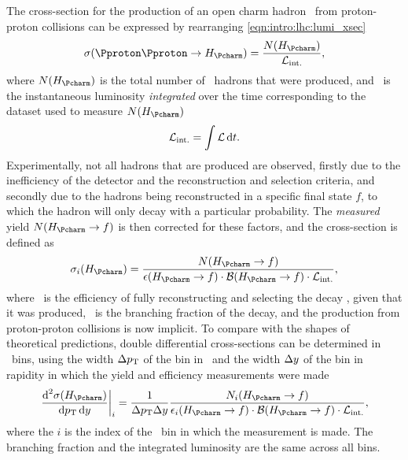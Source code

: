 The cross-section for the production of an open charm hadron \PHc\ from 
proton-proton collisions can be expressed by rearranging 
\cref{eqn:intro:lhc:lumi_xsec}
\begin{equation}
  \xsec(\ppToHc) = \frac{N(\PHc)}{\intlumi},
  \label{eqn:prod:introduction:simple_cross_section}
\end{equation}
where $N(\PHc)$ is the total number of \PHc\ hadrons that were produced, and 
\intlumi\ is the instantaneous luminosity \emph{integrated} over the time 
corresponding to the dataset used to measure $N(\PHc)$
\begin{equation}
  \mathcal{L}_{\textnormal{int.}} = \int \mathcal{L} \mathop{}\!\textnormal{d}{t}.
  \label{eqn:prod:introduction:integrated_lumi}
\end{equation}
Experimentally, not all hadrons that are produced are observed, firstly due to 
the inefficiency of the detector and the reconstruction and selection criteria, 
and secondly due to the hadrons being reconstructed in a specific final state 
$f$, to which the hadron will only decay with a particular probability.
The \emph{measured} yield $N(\HcTof)$ is then corrected for these factors, and the 
cross-section is defined as
\begin{equation}
  \xsec_{i}(\PHc) = \frac{%
    N(\HcTof)
  }{%
    \eff(\HcTof)\cdot\bfrac(\HcTof)\cdot\intlumi
  },
  \label{eqn:prod:introduction:cross_section}
\end{equation}
where \eff\ is the efficiency of fully reconstructing and selecting the decay 
\HcTof, given that it was produced, \bfrac\ is the branching fraction of the 
decay, and the production from proton-proton collisions is now implicit.
To compare with the shapes of theoretical predictions, double differential 
cross-sections can be determined in \pTy\ bins, using the width $\Delta p_{\textnormal{T}}$ 
of the bin in \pT\ and the width $\Delta y$ of the bin in rapidity in 
which the yield and efficiency measurements were made
\begin{equation}
  \left.\frac{\dif^{2}{\xsec(\PHc)}}{\dif{\pT}\dif{\rapidity}}\right\rvert_{i}
    = \frac{1}{\Delta\pT\Delta\rapidity}
      \frac{%
        N_{i}(\HcTof)
      }{%
        \eff_{i}(\HcTof)\cdot\bfrac(\HcTof)\cdot\intlumi
      },
  \label{eqn:prod:introduction:differential_cross_section}
\end{equation}
where the $i$ is the index of the \pTy\ bin in which the measurement is made.
The branching fraction and the integrated luminosity are the same across all bins.

